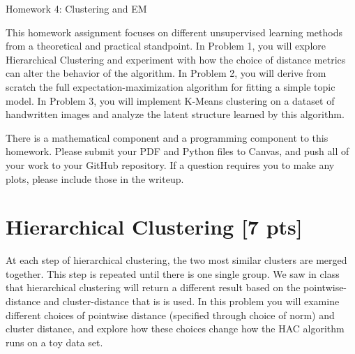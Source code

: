 \documentclass[submit]{harvardml}
\begin{document}
\begin{center}
{\Large Homework 4: Clustering and EM}\\
\end{center}


This homework assignment focuses on different unsupervised learning
methods from a theoretical and practical standpoint.  In Problem 1, you
will explore Hierarchical Clustering and experiment with how the
choice of distance metrics can alter the behavior of the algorithm. In
Problem 2, you will derive from scratch the full
expectation-maximization algorithm for fitting a simple topic
model. In Problem 3, you will implement K-Means clustering on a
dataset of handwritten images and analyze the latent structure learned by 
this algorithm.



There is a mathematical component and a programming component to this homework.
Please submit your PDF and Python files to Canvas, and push all of your work to your GitHub
repository. If a question requires you to make any plots, please
include those in the writeup.



\newpage
\section*{Hierarchical Clustering [7 pts]}

At each step of hierarchical clustering, the two most similar clusters
are merged together. This step is repeated until there is one single
group. We saw in class that hierarchical clustering will return a
different result based on the pointwise-distance and cluster-distance
that is is used. In this problem you will examine different choices of
pointwise distance (specified through choice of norm) and cluster
distance, and explore how these choices change how the HAC algorithm
runs on a toy data set.


\vspace{0.25cm}
\end{document}
